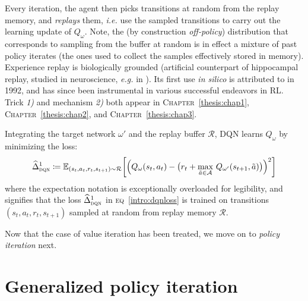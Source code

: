 Every iteration, the agent then picks transitions at random from the replay memory,
and \emph{replays} them, \textit{i.e.} use the sampled transitions to carry out the learning update of $Q_\omega$.
Note, the (by construction \textit{off-policy}) distribution that corresponds to sampling from the buffer at random
is in effect a mixture of past policy iterates (the ones used to collect the samples effectively stored in memory).
Experience replay is biologically grounded (artificial counterpart of hippocampal replay, studied in
neuroscience, \textit{e.g.} in \cite{Foster2006-ai,Mattar2018-ux}).
Its first use \textit{in silico} is attributed to \cite{Lin1992-pp} in 1992, and has since
been instrumental in various successful endeavors in RL.
Trick \textit{1)} and mechanism \textit{2)} both appear in
\textsc{Chapter}~\ref{thesis:chap1}, \textsc{Chapter}~\ref{thesis:chap2}, and \textsc{Chapter}~\ref{thesis:chap3}.

Integrating the target network $\omega'$ and the replay buffer $\mathcal{R}$, DQN learns $Q_\omega$
by minimizing the loss:
\begin{align}
\widehat{\Delta}_\textsc{dqn}^1
\coloneqq
\mathbb{E}_{(s_t,a_t,r_t,s_{t+1}) \sim \mathcal{R}}
\bigg[
\Big(
Q_\omega(s_t,a_t) - \big(r_t + \max_{\tilde{a} \in \mathcal{A}} \, Q_{\omega'}(s_{t+1},\tilde{a})\big)
\Big)^2
\bigg]
\label{intro:dqnloss}
\end{align}
where the expectation notation is exceptionally overloaded for legibility,
and signifies that the loss $\widehat{\Delta}_\textsc{dqn}^1$ in \textsc{eq}~\ref{intro:dqnloss}
is trained on transitions $(s_t,a_t,r_t,s_{t+1})$ sampled at random from replay memory $\mathcal{R}$.

Now that the case of value iteration has been treated,
we move on to \emph{policy iteration} next.

\section{Generalized policy iteration}

